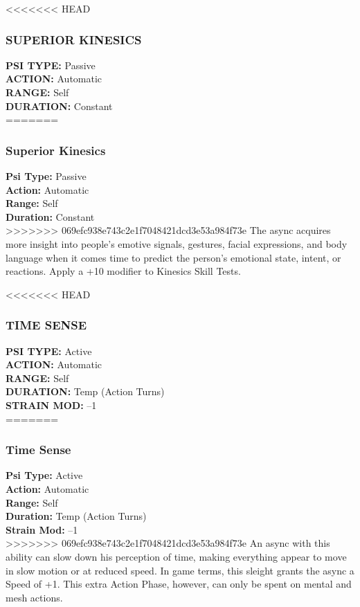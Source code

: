 <<<<<<< HEAD \subsubsection{SUPERIOR KINESICS} \textbf{PSI TYPE:} Passive \\ \textbf{ACTION:} Automatic \\ \textbf{RANGE:} Self \\ \textbf{DURATION:} Constant \\ ======= \subsubsection{Superior Kinesics} \textbf{Psi Type:} Passive \\ \textbf{Action:} Automatic \\ \textbf{Range:} Self \\ \textbf{Duration:} Constant \\ >>>>>>> 069efc938e743c2e1f7048421dcd3e53a984f73e The async acquires more insight into people’s emotive signals, gestures, facial expressions, and body language when it comes time to predict the person’s emotional state, intent, or reactions. Apply a +10 modifier to Kinesics Skill Tests. 

<<<<<<< HEAD \subsubsection{TIME SENSE} \textbf{PSI TYPE:} Active \\ \textbf{ACTION:} Automatic \\ \textbf{RANGE:} Self \\ \textbf{DURATION:} Temp (Action Turns) \\ \textbf{STRAIN MOD:} –1 \\ ======= \subsubsection{Time Sense} \textbf{Psi Type:} Active \\ \textbf{Action:} Automatic \\ \textbf{Range:} Self \\ \textbf{Duration:} Temp (Action Turns) \\ \textbf{Strain Mod:} –1 \\ >>>>>>> 069efc938e743c2e1f7048421dcd3e53a984f73e An async with this ability can slow down his perception of time, making everything appear to move in slow motion or at reduced speed. In game terms, this sleight grants the async a Speed of +1. This extra Action Phase, however, can only be spent on mental and mesh actions. 

